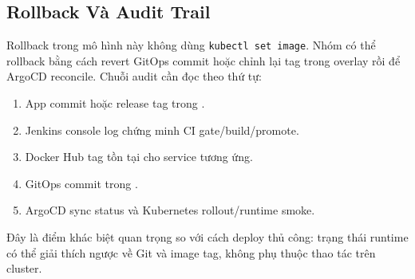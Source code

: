 \subsection{Rollback Và Audit Trail}

Rollback trong mô hình này không dùng \texttt{kubectl set image}. Nhóm có thể rollback bằng
cách revert GitOps commit hoặc chỉnh lại tag trong overlay rồi để ArgoCD reconcile. Chuỗi
audit cần đọc theo thứ tự:

\begin{enumerate}
    \item App commit hoặc release tag trong .
    \item Jenkins console log chứng minh CI gate/build/promote.
    \item Docker Hub tag tồn tại cho service tương ứng.
    \item GitOps commit trong .
    \item ArgoCD sync status và Kubernetes rollout/runtime smoke.
\end{enumerate}

Đây là điểm khác biệt quan trọng so với cách deploy thủ công: trạng thái runtime có thể giải
thích ngược về Git và image tag, không phụ thuộc thao tác trên cluster.
